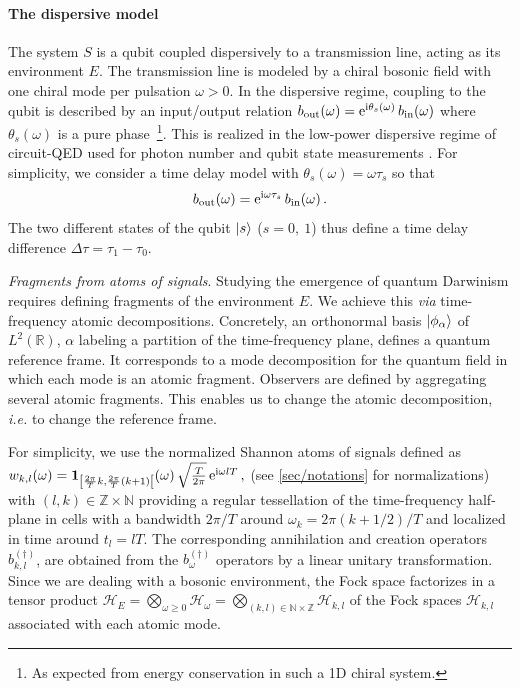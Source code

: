 \paragraph*{The dispersive model} The system $S$ is a qubit coupled
dispersively to a transmission line, 
acting as its environment $E$. 
The transmission line is modeled by a 
chiral bosonic field with one chiral mode per pulsation $\omega>0$.
In the dispersive regime, coupling to the qubit is
described by an input/output relation 
$b_{\text{out}}(\omega)=\mathrm{e}^{\mathrm{i}\theta_s(\omega)}\,b_{\text{in}}(\omega)$ 
where $\theta_s(\omega)$ is a pure phase~\footnote{As expected from
energy conservation in such a 1D chiral system.}.
This is realized in the low-power dispersive regime of circuit-QED 
\cite{Blais-2021-1} used for photon number 
\cite{Gambetta-2006-1,Schuster-2007-1} and qubit state measurements
\cite{Gambetta-2008-1}. 
For simplicity, we consider a time delay model with 
$\theta_s(\omega)=\omega\tau_s$ so that
%
\begin{equation}
b_{\text{out}}(\omega)= \mathrm{e}^{\mathrm{i} \omega\tau_s} 
	\,b_{\text{in}}(\omega)
\,.
\label{eq/scattering}
\end{equation}
The two different states of the qubit $\ket{s}$ ($s=0,\ 1$) thus define a time delay 
difference $\Delta\tau=\tau_1-\tau_0$.
%

\emph{Fragments from atoms of signals}. Studying the emergence
of quantum Darwinism requires defining fragments of the environment 
$E$. We achieve this \emph{via} time-frequency atomic decompositions.
Concretely, an orthonormal basis $\ket{\phi_\alpha}$ of 
$L^2(\mathbb{R})$, $\alpha$ labeling a partition of the time-frequency plane,
defines a quantum reference frame. It corresponds to a 
mode decomposition for the quantum field in which each mode is an atomic 
fragment. Observers are defined 
by aggregating several atomic fragments. 
This enables us to change 
the atomic decomposition, \textit{i.e.} to change the reference frame.

For simplicity, we use the normalized Shannon atoms of signals defined 
as 
$w_{k,l}(\omega)=  \mathbf{1}_{\left[ \frac{2\pi}{T}k,
	\frac{2\pi}{T} (k+1) \right[}(\omega) \, \sqrt{\frac{T}{2\pi}}
	 \,\mathrm{e}^{\mathrm{i} \omega lT}
\,,$
(see \cref{sec/notations} for normalizations)
with $(l,k)\in\mathbb{Z}\times \mathbb{N}$ providing a regular tessellation of 
the time-frequency half-plane in cells with a bandwidth 
$2\pi/T$ around $\omega_k=2\pi(k+1/2) / T$ and localized in time around
$t_l=lT$. The corresponding
annihilation and creation operators 
$b^{(\dagger)}_{k,l}$, are obtained from the $b^{(\dagger)}_\omega$
operators by a linear
unitary transformation. Since we are dealing with a bosonic
environment, the Fock space factorizes in a tensor product
$
\mathcal{H}_E = \bigotimes_{\omega\geq 0} \mathcal{H}_\omega
	=\bigotimes_{(k,l)\in\mathbb{N}\times\mathbb{Z}} \mathcal{H}_{k,l}
$
of the Fock spaces $\mathcal{H}_{k,l}$ associated with each atomic mode.

